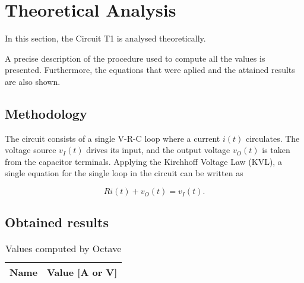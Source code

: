 \section{Theoretical Analysis}
\label{sec:analysis}



In this section, the Circuit T1 is analysed theoretically.

A precise description of the procedure used to compute all the values is presented.
Furthermore, the equations that were aplied and the attained results are also shown.



\subsection{Methodology}

The circuit consists of a single V-R-C loop where a current $i(t)$ circulates. The
voltage source $v_I(t)$ drives its input, and the output voltage $v_O(t)$ is taken from
the capacitor terminals. Applying the Kirchhoff Voltage Law (KVL), a single
equation for the single loop in the circuit can be written as

\begin{equation}
  Ri(t) + v_O(t) = v_I(t).
  \label{eq:kvl}
\end{equation}


\subsection{Obtained results} 

\begin{table}[h]
  \centering
  \begin{tabular}{|l|r|}
    \hline    
    {\bf Name} & {\bf Value [A or V]} \\ \hline
    
  \end{tabular}
  \caption{Values computed by Octave}
  \label{tab:teste}
\end{table}


